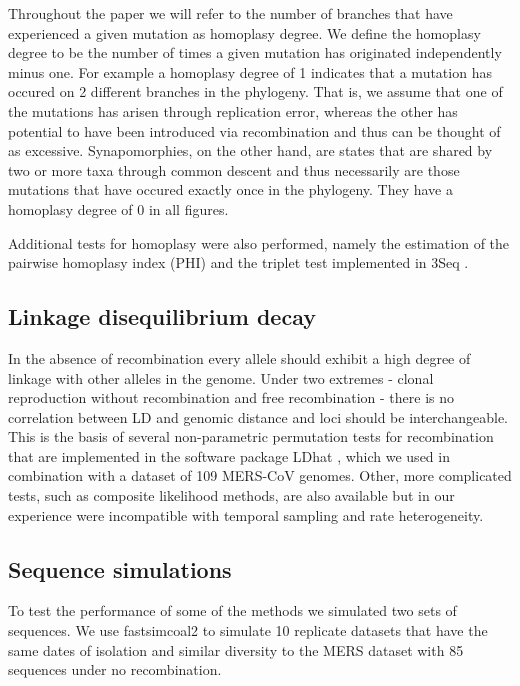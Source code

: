 \documentclass[11pt,oneside,letterpaper]{article}
\begin{document}
Throughout the paper we will refer to the number of branches that have experienced a given mutation as homoplasy degree.
We define the homoplasy degree to be the number of times a given mutation has originated independently minus one.
For example a homoplasy degree of 1 indicates that a mutation has occured on 2 different branches in the phylogeny.
That is, we assume that one of the mutations has arisen through replication error, whereas the other has potential to have been introduced via recombination and thus can be thought of as excessive.
Synapomorphies, on the other hand, are states that are shared by two or more taxa through common descent and thus necessarily are those mutations that have occured exactly once in the phylogeny.
They have a homoplasy degree of 0 in all figures.

Additional tests for homoplasy were also performed, namely the estimation of the pairwise homoplasy index (PHI) \citep{bruen_2006} and the triplet test implemented in 3Seq \citep{boni_2007}.

\subsection*{Linkage disequilibrium decay}
In the absence of recombination every allele should exhibit a high degree of linkage with other alleles in the genome.
Under two extremes - clonal reproduction without recombination and free recombination - there is no correlation between LD and genomic distance and loci should be interchangeable.
This is the basis of several non-parametric permutation tests for recombination that are implemented in the software package LDhat \citep{mcvean_2002}, which we used in combination with a dataset of 109 MERS-CoV genomes.
Other, more complicated tests, such as composite likelihood methods, are also available but in our experience were incompatible with temporal sampling and rate heterogeneity.

\subsection*{Sequence simulations}
To test the performance of some of the methods we simulated two sets of sequences.
We use fastsimcoal2 \citep{excoffier_2013} to simulate 10 replicate datasets that have the same dates of isolation and similar diversity to the MERS dataset with 85 sequences under no recombination.
\end{document}
